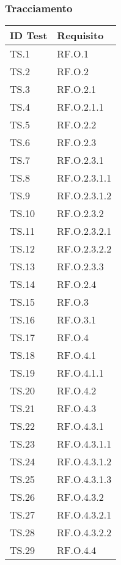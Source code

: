 {{{{{{{{{    
    \subsubsection{Tracciamento}
    {\renewcommand{\arraystretch}{1.5}
    \begin{tabularx}{\textwidth}{p{}|X}
    \textbf{ID Test} & \textbf{Requisito}  \\
    \hline
    TS.1 & RF.O.1 \\
    \hline
    TS.2 & RF.O.2 \\
    \hline
    TS.3 & RF.O.2.1 \\
    \hline
    TS.4 & RF.O.2.1.1 \\
    \hline
    TS.5 & RF.O.2.2 \\
    \hline
    TS.6 & RF.O.2.3 \\
    \hline
    TS.7 & RF.O.2.3.1 \\
    \hline
    TS.8 & RF.O.2.3.1.1 \\
    \hline
    TS.9 & RF.O.2.3.1.2 \\
    \hline
    TS.10 & RF.O.2.3.2 \\
    \hline
    TS.11 & RF.O.2.3.2.1 \\
    \hline
    TS.12 & RF.O.2.3.2.2 \\
    \hline
    TS.13 & RF.O.2.3.3 \\
    \hline
    TS.14 & RF.O.2.4 \\
    \hline
    TS.15 & RF.O.3 \\
    \hline
    TS.16 & RF.O.3.1 \\
    \hline
    TS.17 & RF.O.4 \\
    \hline
    TS.18 & RF.O.4.1 \\
    \hline
    TS.19 & RF.O.4.1.1 \\
    \hline
    TS.20 & RF.O.4.2 \\
    \hline
    TS.21 & RF.O.4.3 \\
    \hline
    TS.22 & RF.O.4.3.1 \\
    \hline
    TS.23 & RF.O.4.3.1.1 \\
    \hline
    TS.24 & RF.O.4.3.1.2 \\
    \hline
    TS.25 & RF.O.4.3.1.3 \\
    \hline
    TS.26 & RF.O.4.3.2 \\
    \hline
    TS.27 & RF.O.4.3.2.1 \\
    \hline
    TS.28 & RF.O.4.3.2.2 \\
    \hline
    TS.29 & RF.O.4.4 \\

\end{tabularx}}}}}}}}}}}
